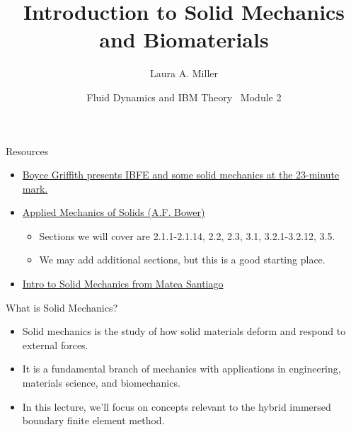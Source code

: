 \documentclass[aspectratio=169,11pt]{beamer}
\title{Introduction to Solid Mechanics and Biomaterials}
\author{Laura A. Miller}
\institute{Department of Mathematics, University of Arizona}
\date{Fluid Dynamics and IBM Theory \textbullet\ Module 2}
\begin{document}
\begin{frame}[plain,b]
\maketutorialtitle
\end{frame}

\begin{frame}{Resources}
  \begin{itemize}
    \item \href{https://www.youtube.com/watch?v=-1TlNJL93sc}{Boyce Griffith presents IBFE and some solid mechanics at the 23-minute mark.}
    \item \href{https://solidmechanics.org/contents.php}{Applied Mechanics of Solids (A.F. Bower)}
    \begin{itemize}
    \item Sections we will cover are 2.1.1-2.1.14, 2.2, 2.3, 3.1, 3.2.1-3.2.12, 3.5.
    \item We may add additional sections, but this is a good starting place.
    \end{itemize}
    \item \href{https://drive.google.com/drive/folders/1vkhrX0YInMm5pfUj3LcRA9TV0DZdFp1a?usp=sharing}{Intro to Solid Mechanics from Matea Santiago}    
  \end{itemize}
\end{frame}

\begin{frame}{What is Solid Mechanics?}
    \begin{itemize}
        \item Solid mechanics is the study of how solid materials deform and respond to external forces.
        \item It is a fundamental branch of mechanics with applications in engineering, materials science, and biomechanics.
        \item In this lecture, we'll focus on concepts relevant to the hybrid immersed boundary finite element method.
    \end{itemize}
\end{frame}
\end{document}
